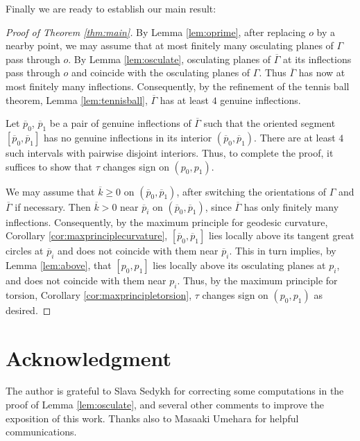 \documentclass[11pt]{amsart}
\theoremstyle{definition}
\newcommand{\ol}{\overline}
\renewcommand{\(}{\left(}
\renewcommand{\)}{\right)}
\begin{document}
Finally we are ready to establish our main result:

\begin{proof}[Proof of Theorem \ref{thm:main}]
By Lemma \ref{lem:oprime}, after replacing $o$ by a nearby point, we may assume that at most finitely many osculating planes of $\Gamma$ pass through $o$. By Lemma \ref{lem:osculate}, osculating planes of $\ol\Gamma$ at its inflections pass through $o$ and coincide with the osculating planes of $\Gamma$. Thus  $\ol\Gamma$ has now at most finitely many inflections. 
Consequently, by the refinement of the tennis ball theorem, Lemma \ref{lem:tennisball},  $\ol\Gamma$ has at least $4$ genuine inflections. 

Let $\ol p_0$, $\ol p_1$ be a pair of  genuine inflections of $\ol\Gamma$ such that the oriented segment 
$[\ol p_0, \ol p_1]$   has no genuine inflections in its interior $(\ol p_0, \ol p_1)$. There are at least $4$ such intervals with pairwise disjoint interiors. Thus, to complete the proof, it suffices to show that $\tau$ changes sign on $(p_0, p_1)$. 

We may assume that $\ol k\geq 0$ on $(\ol p_0,\ol p_1)$, after switching the orientations of $\Gamma$ and $\ol\Gamma$ if necessary. Then $\ol k>0$ near $\ol p_i$ on $(\ol p_0,\ol p_1)$, since  $\ol\Gamma$ has only finitely many inflections. Consequently,  by the maximum principle for geodesic curvature, Corollary \ref{cor:maxprinciplecurvature}, $[\ol p_0, \ol p_1]$ lies locally above its tangent great circles at $\ol p_i$ and does not coincide with them near $\ol p_i$.
This in turn implies, by Lemma \ref{lem:above},
 that 
$[p_0, p_1]$ lies locally above its osculating planes at $p_i$, and does not coincide with them near $p_i$. Thus, by  the maximum principle for torsion, Corollary \ref{cor:maxprincipletorsion}, $\tau$ changes sign on $(p_0, p_1)$ as desired.
\end{proof}

\section*{Acknowledgment}
The author is grateful to Slava Sedykh for correcting some computations in the proof of Lemma \ref{lem:osculate}, and several other comments to improve the exposition of this work. Thanks also to Masaaki Umehara for helpful communications.


\end{document}
